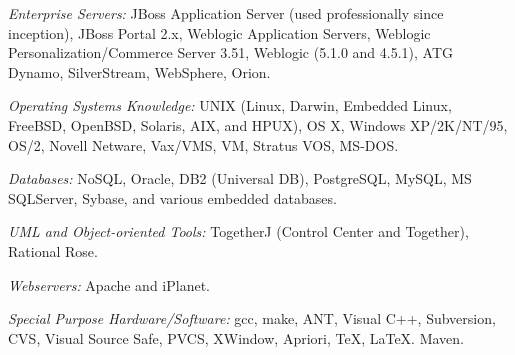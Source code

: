 \documentclass[10pt]{report}
\begin{document}
\begin{description}
\item{\emph{Enterprise Servers:}} JBoss Application Server (used professionally
since inception), JBoss Portal 2.x, Weblogic Application Servers,  Weblogic
Personalization/Commerce Server 3.51, Weblogic (5.1.0 and 4.5.1), ATG Dynamo,
SilverStream, WebSphere, Orion.


\item{\emph{Operating Systems Knowledge:}} UNIX (Linux, Darwin, Embedded Linux,
FreeBSD, OpenBSD, Solaris, AIX, and HPUX), OS X,  Windows XP/2K/NT/95, OS/2,
Novell Netware, Vax/VMS, VM, Stratus VOS, MS-DOS.

\item{\emph{Databases:}} NoSQL, Oracle, DB2 (Universal DB), PostgreSQL, MySQL,
MS SQLServer, Sybase, and various embedded databases.

\item{\emph{UML and Object-oriented Tools:}} TogetherJ (Control Center and
Together), Rational Rose.

\item{\emph{Webservers:}} Apache and iPlanet.

\item{\emph{Special Purpose Hardware/Software:}} gcc, make, ANT, Visual C++,
Subversion, CVS, Visual Source Safe, PVCS, XWindow, Apriori, \TeX, \LaTeX.
Maven.


\end{description}

%
%
%
%
%
%
%
%
%
%
%
%
\end{document}
